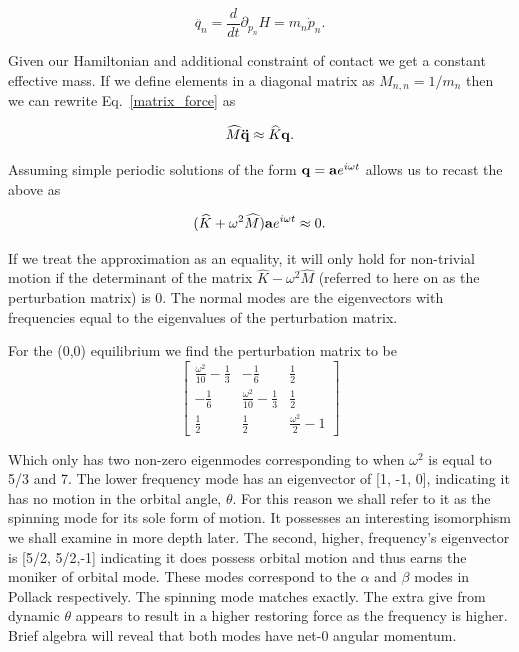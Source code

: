 \documentclass[prbg,preprint]{revtex4-1}
\newcommand{\cvec}[1]{{\rm{\bf{#1}}}}
\begin{document}
\begin{equation}
	\ddot{ q_n } =\frac{d}{dt} \partial_{p_n} H = m_n \dot p_n.
\end{equation}

Given our Hamiltonian and additional constraint of contact we get a constant effective mass. If we define elements in a diagonal matrix as 
$M_{n,n}=1/m_n$
then we can rewrite Eq.~\ref{matrix_force} as 

\begin{equation}
	\widehat M \cvec{ \ddot{ q }} \approx \widehat K \cvec q.
\end{equation}

Assuming simple periodic solutions of the form $\cvec q = \cvec a e^{i\omega t}$ allows us to recast the above as

\begin{equation}
	( 
	\widehat K + \omega^2 \widehat M
	)  \cvec{ a}e^{i\omega t} \approx 0 .
\end{equation}

If we treat the approximation as an equality, it will only hold for non-trivial motion if the determinant of the matrix $\widehat K - \omega^2 \widehat M$ (referred to here on as the perturbation matrix) is 0. The normal modes are the eigenvectors with frequencies equal to the eigenvalues of the perturbation matrix.

For the (0,0) equilibrium we find the perturbation matrix to be
\begin{equation}
	\left[\begin{matrix}
	\frac{\omega^{2}}{10} - \frac{1}{3} & - \frac{1}{6} & \frac{1}{2}\\
	- \frac{1}{6} & \frac{\omega^{2}}{10} - \frac{1}{3} & \frac{1}{2}\\
	\frac{1}{2} & \frac{1}{2} & \frac{\omega^{2}}{2} - 1
	\end{matrix}\right]
\end{equation}

Which only has two non-zero eigenmodes corresponding to when $\omega^2$ is equal to 5/3 and 7. The lower frequency mode has an eigenvector of [1, -1, 0], indicating it has no motion in the orbital angle, $\theta$. For this reason we shall refer to it as the spinning mode for its sole form of motion. It possesses an interesting isomorphism we shall examine in more depth later. The second, higher, frequency's eigenvector is [5/2, 5/2,-1] indicating it does possess orbital motion and thus earns the moniker of orbital mode. These modes correspond to the $\alpha$ and $\beta$ modes in Pollack \cite{doi:10.1139/p96-151} respectively. The spinning mode matches exactly. 
The extra give from dynamic $\theta$ appears to result in a higher restoring force as the frequency is higher.
Brief algebra will reveal that both modes have net-0 angular momentum.
\end{document}

